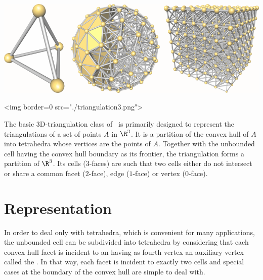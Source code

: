 %

\begin{ccTexOnly}
\begin{center}
\includegraphics[width=15cm]{Triangulation_3/triangulation3}
\end{center}
\end{ccTexOnly}
\begin{ccHtmlOnly}
<img border=0 src="./triangulation3.png">
\end{ccHtmlOnly}

The basic 3D-triangulation class of \cgal\ is primarily designed to
represent the triangulations of a set of points $A$ in $\R^3$.  It is
a partition of the convex hull of {$A$} into tetrahedra whose vertices
are the points of {$A$}.  Together with the unbounded cell having the
convex hull boundary as its frontier, the triangulation forms a
partition of $\R^3$. Its cells ($3$-faces) are such that two cells
either do not intersect or share a common facet ($2$-face), edge
($1$-face) or vertex ($0$-face).

\section{Representation}
\label{Triangulation3-sec-intro}

In order to deal
only with tetrahedra, which is convenient for many applications, the
unbounded cell can be subdivided into tetrahedra by considering that
each convex hull facet is incident to an  having as
fourth vertex an auxiliary vertex called the .  In
that way, each facet is incident to exactly two cells and special cases
at the boundary of the convex hull are simple to deal with.

